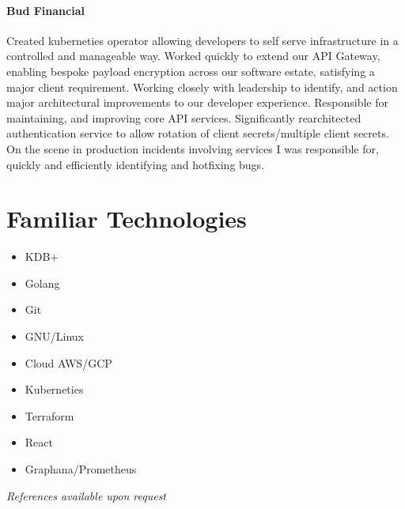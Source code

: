 \documentclass[9pt,a4paper]{article}
\begin{document}
\begin{multicols*}{2}
\paragraph{Bud Financial} Created kuberneties operator allowing developers to self serve infrastructure in a controlled and manageable way.
Worked quickly to extend our API Gateway, enabling bespoke payload encryption across our software estate, satisfying a major client requirement.
Working closely with leadership to identify, and action major architectural improvements to our developer experience.
Responsible for maintaining, and improving core API services.
Significantly rearchitected authentication service to allow rotation of client secrets/multiple client secrets.
On the scene in production incidents involving services I was responsible for, quickly and efficiently identifying and hotfixing bugs.


\section*{Familiar Technologies}
\begin{multicols*}{2}
\begin{itemize}
\item KDB+
\item Golang
\item Git
\item GNU/Linux
\item Cloud AWS/GCP
\item Kuberneties
\item Terraform
\item React
\item Graphana/Prometheus
\end{itemize}
\end{multicols*}
\vfill
\textit{References available upon request}
\end{multicols*}
\end{document}
